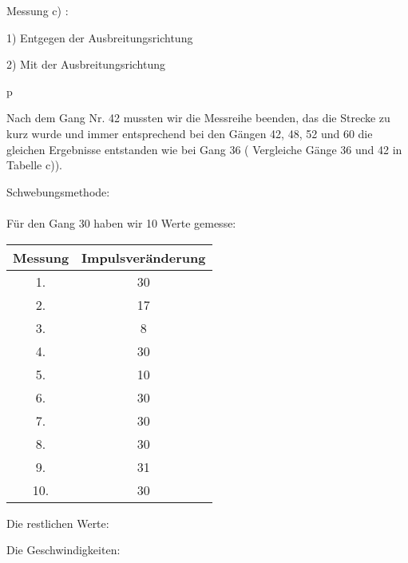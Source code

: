 \begin{landscape}
  Messung c) :

  1) Entgegen der Ausbreitungsrichtung
  \begin{table}
  \end{table}

  2) Mit der Ausbreitungsrichtung
  \begin{table}
  \end{table}p
\end{landscape}


Nach dem Gang Nr. 42 mussten wir die Messreihe beenden, das die Strecke zu kurz wurde
und immer entsprechend bei den Gängen 42, 48, 52 und 60 die gleichen Ergebnisse
entstanden wie bei Gang 36 ( Vergleiche Gänge 36 und 42 in Tabelle c)).

Schwebungsmethode:
\\
\\
Für den Gang 30 haben wir 10 Werte gemesse:

\begin{table}
  \centering
  \begin{tabular}{c c}
    \toprule
    {Messung} & {Impulsveränderung} \\
    \midrule
    1.  & 30 \\
    2.  & 17 \\
    3.  & 8  \\
    4.  & 30 \\
    5.  & 10 \\
    6.  & 30 \\
    7.  & 30 \\
    8.  & 30 \\
    9.  & 31 \\
    10. & 30 \\
    \bottomrule
  \end{tabular}
\end{table}

Die restlichen Werte:

\begin{table}
 \centering
\end{table}

Die Geschwindigkeiten:

\begin{table}
  \centering
\end{table}

\begin{table}
  \centering
\end{table}

\begin{table}
  \centering
\end{table}


